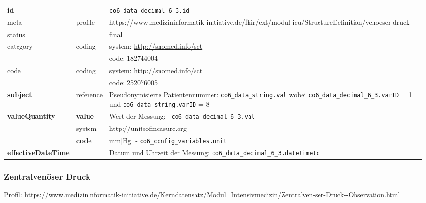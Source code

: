\begin{longtable}{|l|l|p{7.5cm}|}
        \hline
        \rowcolor{lightgray} \multicolumn{3}{|l|}{Data Mapping (inhaltlich)} \\ \hline
        \textbf{id} &  & \texttt{co6\_data\_decimal\_6\_3.id} \\ \hline
	meta & profile & https://www.medizininformatik-initiative.de/fhir/ext/modul-icu/StructureDefinition/venoeser-druck \\ \hline 
	status &  & final   \\ \hline 
	category & coding & system: \url{http://snomed.info/sct} \\
\cline{3-3}
	& & code: 182744004 \\ \hline
	code & coding & system: \url{http://snomed.info/sct} \\ 
	\cline{3-3} 
	&  & code: 252076005 \\ \hline
	 	\textbf{subject} & reference & Pseudonymisierte Patientennummer: \texttt{co6\_data\_string.val} wobei \texttt{co6\_data\_decimal\_6\_3.varID} = 1 und \texttt{co6\_data\_string.varID} = 8 \\ \hline
	 \textbf{valueQuantity}  & \textbf{value} & Wert der Messung: \texttt{
co6\_data\_decimal\_6\_3.val} \\
        \cline{2-3}
         & system & http://unitsofmeasure.org \\
         \cline{2-3}
         & \textbf{code} & mm[Hg] - \texttt{co6\_config\_variables.unit} \\ \hline
     \textbf{effectiveDateTime}  & & Datum und Uhrzeit der Messung: \texttt{co6\_data\_decimal\_6\_3.datetimeto} \\ \hline
\end{longtable}

\subsubsection{Zentralvenöser Druck} 

Profil: \url{https://www.medizininformatik-initiative.de/Kerndatensatz/Modul_Intensivmedizin/Zentralven-ser-Druck--Observation.html}

